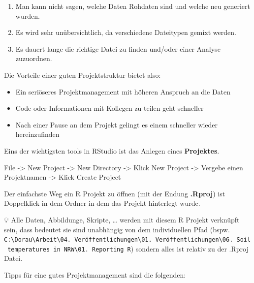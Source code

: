 \documentclass[
]{article}
\providecommand{\tightlist}{%
  \setlength{\itemsep}{0pt}\setlength{\parskip}{0pt}}
\begin{document}
\begin{enumerate}
\def\labelenumi{\arabic{enumi}.}
\tightlist
\item
  Man kann nicht sagen, welche Daten Rohdaten sind und welche neu generiert wurden.
\item
  Es wird sehr unübersichtlich, da verschiedene Dateitypen gemixt werden.
\item
  Es dauert lange die richtige Datei zu finden und/oder einer Analyse zuzuordnen.
\end{enumerate}

Die Vorteile einer guten Projektstruktur bietet also:

\begin{itemize}
\tightlist
\item
  Ein seriöseres Projektmanagement mit höheren Anspruch an die Daten
\item
  Code oder Informationen mit Kollegen zu teilen geht schneller
\item
  Nach einer Pause an dem Projekt gelingt es einem schneller wieder hereinzufinden
\end{itemize}

Eins der wichtigsten tools in RStudio ist das Anlegen eines \textbf{Projektes}.

File -\textgreater{} New Project -\textgreater{} New Directory -\textgreater{} Klick New Project -\textgreater{} Vergebe einen Projektnamen -\textgreater{} Klick Create Project

Der einfachste Weg ein R Projekt zu öffnen (mit der Endung \textbf{.Rproj}) ist Doppelklick in dem Ordner in dem das Projekt hinterlegt wurde.

💡 Alle Daten, Abbildunge, Skripte, \ldots{} werden mit diesem R Projekt verknüpft sein, dass bedeutet sie sind unabhängig von dem individuellen Pfad (bspw. \texttt{C:\textbackslash{}Dorau\textbackslash{}Arbeit\textbackslash{}04.\ Veröffentlichungen\textbackslash{}01.\ Veröffentlichungen\textbackslash{}06.\ Soil\ temperatures\ in\ NRW\textbackslash{}01.\ Reporting\ R}) sondern alles ist relativ zu der .Rproj Datei.

Tipps für eine gutes Projektmanagement sind die folgenden:
\end{document}
